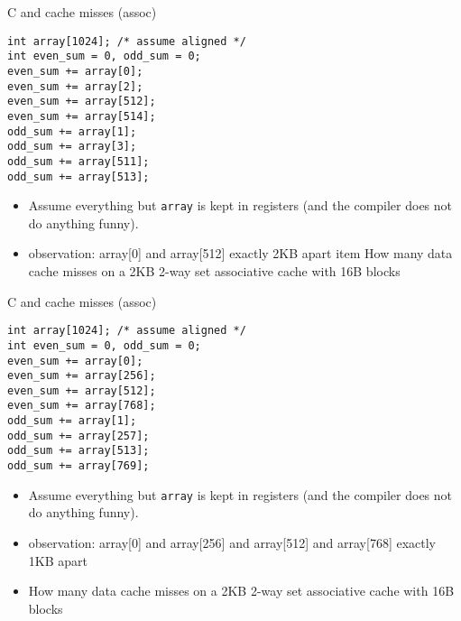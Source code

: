 \begin{frame}[fragile,label=arrayMissesAssoc4]{C and cache misses (assoc)}
\begin{lstlisting}[style=smaller]
int array[1024]; /* assume aligned */
int even_sum = 0, odd_sum = 0;
even_sum += array[0];
even_sum += array[2];
even_sum += array[512];
even_sum += array[514];
odd_sum += array[1];
odd_sum += array[3];
odd_sum += array[511];
odd_sum += array[513];
\end{lstlisting}
\begin{itemize}
\item {\small
Assume everything but {\tt array} is kept in registers (and the compiler does not do
anything funny).}
\item observation: array[0] and array[512] exactly 2KB apart
item How many data cache misses on a 2KB 2-way set associative cache with 16B blocks
\end{itemize}
\end{frame}

\begin{frame}[fragile,label=arrayMissesWarmup4]{C and cache misses (assoc)}
\begin{lstlisting}[style=smaller]
int array[1024]; /* assume aligned */
int even_sum = 0, odd_sum = 0;
even_sum += array[0];
even_sum += array[256];
even_sum += array[512];
even_sum += array[768];
odd_sum += array[1];
odd_sum += array[257];
odd_sum += array[513];
odd_sum += array[769];
\end{lstlisting}
\begin{itemize}
\item {\small
Assume everything but {\tt array} is kept in registers (and the compiler does not do
anything funny).}
\item observation: array[0] and array[256] and array[512] and array[768] exactly 1KB apart
\item How many data cache misses on a 2KB 2-way set associative cache with 16B blocks
\end{itemize}
\end{frame}
